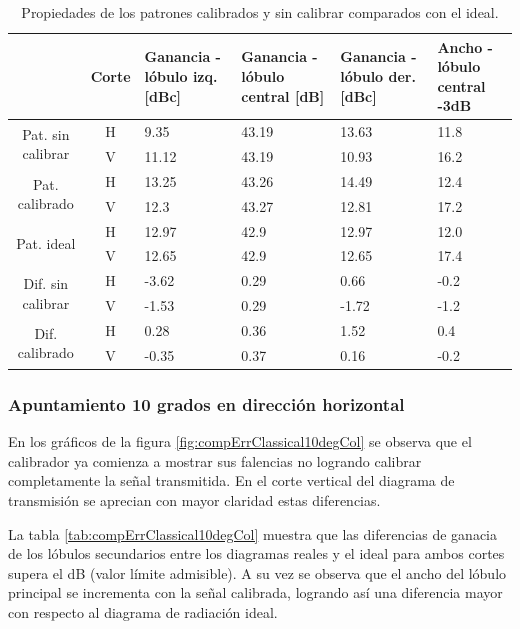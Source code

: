 \begin{table}[H]
  \footnotesize
  \centering
  \begin{tabular}{|c|c|p{2cm}|p{2.5cm}|p{2.5cm}|p{2.5cm}|}
    \cline{2-6}
    \multicolumn{1}{c|}{} & Corte & Ganancia - lóbulo izq. [dBc] & Ganancia - lóbulo central [dB] &
    Ganancia - lóbulo der. [dBc] & Ancho - lóbulo central -3dB \tabularnewline\hline
    \multirow{2}{2cm}{Pat. sin calibrar} & H & 9.35 & 43.19 & 13.63 & 11.8 \tabularnewline\cline{2-6}
     & V & 11.12 & 43.19 & 10.93 & 16.2 \tabularnewline\hline
    \multirow{2}{2cm}{Pat. calibrado} & H & 13.25 & 43.26 & 14.49 & 12.4 \tabularnewline\cline{2-6}
     & V & 12.3 & 43.27 & 12.81 & 17.2 \tabularnewline\hline
    \multirow{2}{2cm}{Pat. ideal} & H & 12.97 & 42.9 & 12.97 & 12.0 \tabularnewline\cline{2-6}
     & V & 12.65 & 42.9 & 12.65 & 17.4 \tabularnewline\hline
    \multirow{2}{2cm}{Dif. sin calibrar} & H & -3.62 & 0.29 & 0.66 & -0.2\tabularnewline\cline{2-6}
     & V & -1.53 & 0.29 & -1.72 & -1.2 \tabularnewline\hline
    \multirow{2}{2cm}{Dif. calibrado} & H & 0.28 & 0.36 & 1.52 & 0.4 \tabularnewline\cline{2-6}
     & V & -0.35 & 0.37 & 0.16 & -0.2 \tabularnewline\hline
  \end{tabular}
  \caption{Propiedades de los patrones calibrados y sin calibrar comparados con el ideal.}
  \label{tab:compErrClassical0deg}
\end{table}


\subsubsection{Apuntamiento 10 grados en dirección horizontal}

En los gráficos de la figura \ref{fig:compErrClassical10degCol} se observa que el calibrador ya comienza a mostrar sus falencias no 
logrando calibrar completamente la señal transmitida. En el corte vertical del diagrama de transmisión se aprecian con mayor 
claridad estas diferencias.

La tabla \ref{tab:compErrClassical10degCol} muestra que las diferencias de ganacia de los lóbulos secundarios entre los diagramas 
reales y el ideal para ambos cortes supera el dB (valor límite admisible). A su vez se observa que el ancho del lóbulo 
principal se incrementa con la señal calibrada, logrando así una diferencia mayor con respecto al diagrama de radiación ideal.

